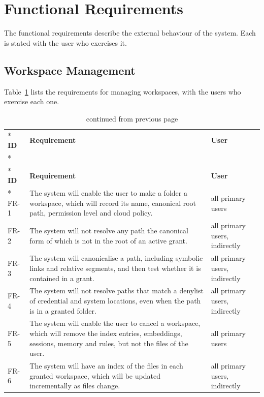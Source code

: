 \documentclass{FastFyp}
\begin{document}
\section{Functional Requirements}
The functional requirements describe the external behaviour of the system. Each is stated with the user who exercises it.

\subsection{Workspace Management}
Table~\ref{tab:fr1} lists the requirements for managing workspaces, with the users who exercise each one.

{\small
{}
\begin{longtable}{|p{1.3cm}|p{9.8cm}|p{3.0cm}|}
\caption{Functional requirements: workspace management.}\label{tab:fr1}\\*
\hline
\textbf{ID} & \textbf{Requirement} & \textbf{User} \\*
\hline
\endfirsthead
\caption[]{continued from previous page}\\*
\hline
\textbf{ID} & \textbf{Requirement} & \textbf{User} \\*
\hline
\endhead
FR-1 & The system will enable the user to make a folder a workspace, which will record its name, canonical root path, permission level and cloud policy. & all primary users \\
\hline
FR-2 & The system will not resolve any path the canonical form of which is not in the root of an active grant. & all primary users, indirectly \\
\hline
FR-3 & The system will canonicalise a path, including symbolic links and relative segments, and then test whether it is contained in a grant. & all primary users, indirectly \\
\hline
FR-4 & The system will not resolve paths that match a denylist of credential and system locations, even when the path is in a granted folder. & all primary users, indirectly \\
\hline
FR-5 & The system will enable the user to cancel a workspace, which will remove the index entries, embeddings, sessions, memory and rules, but not the files of the user. & all primary users \\
\hline
FR-6 & The system will have an index of the files in each granted workspace, which will be updated incrementally as files change. & all primary users, indirectly \\
\hline
\end{longtable}
}
\end{document}

